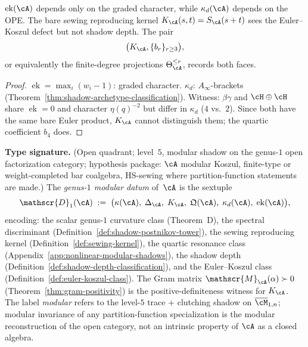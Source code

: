 \begin{corollary}[\ClaimStatusConditional]%
\label{cor:two-faces-theta}%
%
$\operatorname{ek}(\cA)$ depends only on the graded character, while
$\kappa_d(\cA)$ depends on the OPE. The bare sewing reproducing kernel
$K_\cA(s,t)=S_\cA(s+t)$ sees the Euler--Koszul defect but not shadow
depth. The pair
\[
\bigl(K_\cA,\{b_r\}_{r\geq3}\bigr),
\]
or equivalently the finite-degree projections
$\Theta_\cA^{\leq r}$, records both faces.
\end{corollary}

\begin{proof}
$\operatorname{ek} = \max_i(w_i - 1)$: graded character.
$\kappa_d$: $A_\infty$-brackets
(Theorem~\ref{thm:shadow-archetype-classification}).
Witness: $\beta\gamma$ and $\cH \oplus \cH$ share
$\operatorname{ek} = 0$ and character $\eta(q)^{-2}$
but differ in $\kappa_d$ ($4$ vs.\ $2$). Since both have the same
bare Euler product, $K_\cA$ cannot distinguish them; the quartic
coefficient $b_4$ does.
\end{proof}

\begin{definition}%
\label{def:platonic-arithmetic-package}%
\label{def:genus1-modular-datum}%
%
\textbf{Type signature.} (Open quadrant; level~$5$, modular shadow on
the genus-$1$ open factorization category; hypothesis package: $\cA$
modular Koszul, finite-type or weight-completed bar coalgebra,
HS-sewing where partition-function statements are made.)
The \emph{genus-$1$ modular datum} of~$\cA$ is the sextuple
\begin{equation}\label{eq:full-genus1-package}
\mathscr{D}_1(\cA)
\;:=\;
\bigl(
\kappa(\cA),\;
\Delta_\cA,\;
K_\cA,\;
\mathfrak{Q}(\cA),\;
\kappa_d(\cA),\;
\operatorname{ek}(\cA)
\bigr),
\end{equation}
encoding: the scalar genus-$1$ curvature class
\textup{(}Theorem~D\textup{)}, the spectral discriminant
\textup{(}Definition~\textup{\ref{def:shadow-postnikov-tower}}\textup{)},
the sewing reproducing kernel
\textup{(}Definition~\textup{\ref{def:sewing-kernel}}\textup{)},
the quartic resonance class
\textup{(}Appendix~\textup{\ref{app:nonlinear-modular-shadows}}\textup{)},
the shadow depth
\textup{(}Definition~\textup{\ref{def:shadow-depth-classification}}\textup{)},
and the Euler--Koszul class
\textup{(}Definition~\textup{\ref{def:euler-koszul-class}}\textup{)}.
The Gram matrix $\mathscr{M}_\cA(\alpha) \succ 0$
\textup{(}Theorem~\textup{\ref{thm:gram-positivity}}\textup{)}
is the positive-definiteness witness for $K_\cA$.
The label \emph{modular} refers to the level-$5$ trace + clutching
shadow on $\overline{\cM}_{1,n}$; modular invariance of any
partition-function specialization is the modular reconstruction of
the open category, not an intrinsic property of $\cA$ as a closed
algebra.
\end{definition}

